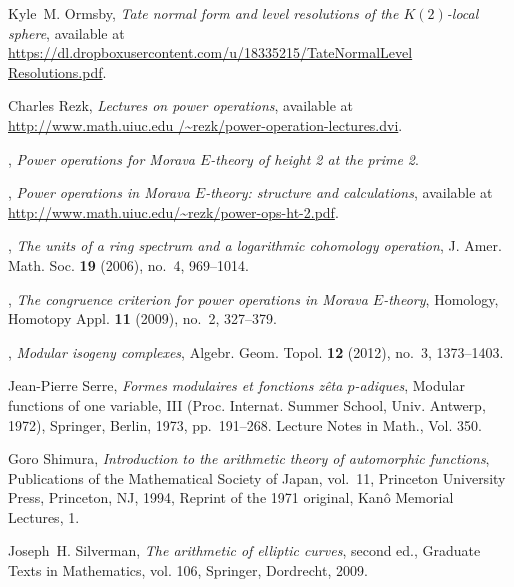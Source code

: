 \documentclass{gtpart}
\theoremstyle{definition}
\theoremstyle{remark}
\renewcommand{\=}{\approx}
\renewcommand{\-}{\sim}
\numberwithin{equation}{section}
\numberwithin{thm}{section}
\begin{document}
\begin{thebibliography}
Kyle~M. Ormsby, \emph{Tate normal form and level resolutions of the
  {$K(2)$}-local sphere}, available at 
  \href{https://dl.dropboxusercontent.com/u/18335215/\name}
  {https://dl.dropboxusercontent.com/u/18335215/TateNormalLevel\linebreak
  Resolutions.pdf}.

Charles Rezk, \emph{Lectures on power operations}, 
  available at 
  \href{http://www.math.uiuc.edu/~rezk/power-operation-lectures.dvi}
  {http://www.math.uiuc.edu\linebreak
  /\textasciitilde rezk/power-operation-lectures.dvi}.

\bysame, \emph{Power operations for {M}orava {$E$}-theory of height 2 at the
  prime 2}. 

\bysame, \emph{Power operations in {M}orava {$E$}-theory: structure and
  calculations},
  available at \href{http://www.math.uiuc.edu/~rezk/power-ops-ht-2.pdf}
  {http://www.math.uiuc.edu/\textasciitilde rezk/power-ops-ht-2.pdf}.

\bysame, \emph{The units of a ring spectrum and a logarithmic cohomology
  operation}, J. Amer. Math. Soc. \textbf{19} (2006), no.~4, 969--1014.

\bysame, \emph{The congruence criterion for power operations in {M}orava
  {$E$}-theory}, Homology, Homotopy Appl. \textbf{11} (2009), no.~2, 327--379.

\bysame, \emph{Modular isogeny complexes}, Algebr. Geom. Topol. \textbf{12}
  (2012), no.~3, 1373--1403. 

Jean-Pierre Serre, \emph{Formes modulaires et fonctions z\^eta {$p$}-adiques},
  Modular functions of one variable, {III} ({P}roc. {I}nternat. {S}ummer
  {S}chool, {U}niv. {A}ntwerp, 1972), Springer, Berlin, 1973, pp.~191--268.
  Lecture Notes in Math., Vol. 350. 

Goro Shimura, \emph{Introduction to the arithmetic theory of automorphic
  functions}, Publications of the Mathematical Society of Japan, vol.~11,
  Princeton University Press, Princeton, NJ, 1994, Reprint of the 1971
  original, Kan{\^o} Memorial Lectures, 1. 

Joseph~H. Silverman, \emph{The arithmetic of elliptic curves}, second ed.,
  Graduate Texts in Mathematics, vol. 106, Springer, Dordrecht, 2009.


\end{thebibliography}
\end{document}

